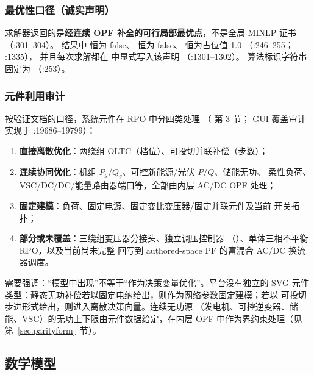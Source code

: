 \subsubsection*{最优性口径（诚实声明）}
求解器返回的是\textbf{经连续 OPF 补全的可行局部最优点}，不是全局 MINLP 证书
（:301--304）。
结果中  恒为 false、
恒为 false、 恒为占位值 1.0
（:246--255；
:1335），
并且每次求解都在  中显式写入该声明
（:1301--1302）。
算法标识字符串固定为
（:253）。

\subsubsection*{元件利用审计}
按验证文档的口径，系统元件在 RPO 中分四类处理
（ 第 3 节；
GUI 覆盖审计实现于 :19686--19799）：
\begin{enumerate}
  \item \textbf{直接离散优化}：两绕组 OLTC（档位）、可投切并联补偿（步数）；
  \item \textbf{连续协同优化}：机组 $P_g/Q_g$、可控新能源/光伏 $P/Q$、储能无功、
        柔性负荷、VSC/DC/DC/能量路由器端口等，全部由内层 AC/DC OPF 处理；
  \item \textbf{固定建模}：负荷、固定电源、固定变比变压器/固定并联元件及当前
        开关拓扑；
  \item \textbf{部分或未覆盖}：三绕组变压器分接头、独立调压控制器
        （）、单体三相不平衡 RPO，以及当前尚未完整
        回写到 authored-space PF 的富混合 AC/DC 换流器调度。
\end{enumerate}
需要强调：“模型中出现”不等于“作为决策变量优化”。平台没有独立的 SVG 元件
类型：静态无功补偿若以固定电纳给出，则作为网络参数固定建模；若以
 可投切步进形式给出，则进入离散决策向量。连续无功源
（发电机、可控逆变器、储能、VSC）的无功上下限由元件数据给定，在内层 OPF
中作为界约束处理（见第~\ref{sec:parityform}~节）。

\subsection{数学模型}

